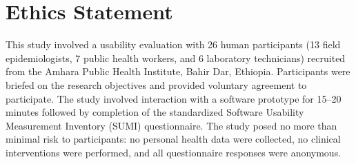 \documentclass[AMA,LATO1COL]{WileyNJD-v2}
\begin{document}
\section*{Ethics Statement}
This study involved a usability evaluation with 26 human participants (13 field epidemiologists, 7 public health workers, and 6 laboratory technicians) recruited from the Amhara Public Health Institute, Bahir Dar, Ethiopia. Participants were briefed on the research objectives and provided voluntary agreement to participate. The study involved interaction with a software prototype for 15--20 minutes followed by completion of the standardized Software Usability Measurement Inventory (SUMI) questionnaire. The study posed no more than minimal risk to participants: no personal health data were collected, no clinical interventions were performed, and all questionnaire responses were anonymous.


\end{document}

